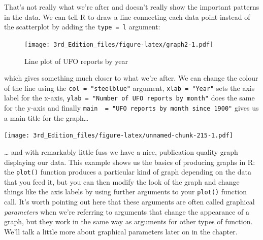 \documentclass[
]{book}
\newenvironment{Shaded}{\begin{snugshade}}{\end{snugshade}}
\newcommand{\DataTypeTok}[1]{\textcolor[rgb]{0.13,0.29,0.53}{#1}}
\newcommand{\KeywordTok}[1]{\textcolor[rgb]{0.13,0.29,0.53}{\textbf{#1}}}
\newcommand{\NormalTok}[1]{#1}
\newcommand{\OperatorTok}[1]{\textcolor[rgb]{0.81,0.36,0.00}{\textbf{#1}}}
\newcommand{\StringTok}[1]{\textcolor[rgb]{0.31,0.60,0.02}{#1}}
\begin{document}
That's not really what we're after and doesn't really show the important patterns in the data. We can tell R to draw a line connecting each data point instead of the scatterplot by adding the \texttt{type\ =\ \textquotesingle{}l\textquotesingle{}} argument:

\begin{Shaded}
\end{Shaded}

\begin{figure}
\centering
\texttt{[image: 3rd\_Edition\_files/figure-latex/graph2-1.pdf]}
\caption{\label{fig:graph2}Line plot of UFO reports by year}
\end{figure}

which gives something much closer to what we're after. We can change the colour of the line using the \texttt{col\ =\ "steelblue"} argument, \texttt{xlab\ =\ "Year"} sets the axis label for the x-axis, \texttt{ylab\ =\ "Number\ of\ UFO\ reports\ by\ month"} does the same for the y-axis and finally \texttt{main\ \ =\ "UFO\ reports\ by\ month\ since\ 1900"} gives us a main title for the graph\ldots{}

\begin{Shaded}
\end{Shaded}

\texttt{[image: 3rd\_Edition\_files/figure-latex/unnamed-chunk-215-1.pdf]}

\ldots{} and with remarkably little fuss we have a nice, publication quality graph displaying our data. This example shows us the basics of producing graphs in R: the \texttt{plot()} function produces a particular kind of graph depending on the data that you feed it, but you can then modify the look of the graph and change things like the axis labels by using further arguments to your \texttt{plot()} function call. It's worth pointing out here that these arguments are often called graphical \emph{parameters} when we're referring to arguments that change the appearance of a graph, but they work in the same way as arguments for other types of function. We'll talk a little more about graphical parameters later on in the chapter.
\end{document}
